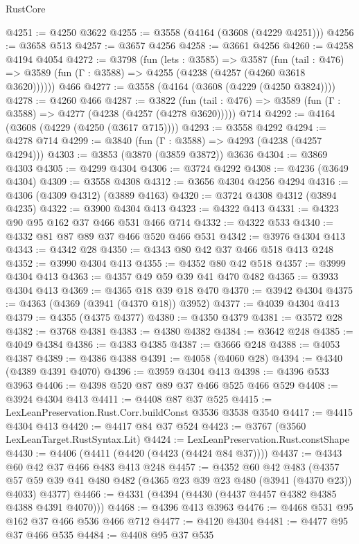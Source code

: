 \begin{lexlean}{RustCore}
\begin{coremodule}
@4251 := @4250 @3622
@4255 := @3558 (@4164 (@3608 (@4229 @4251)))
@4256 := @3658 @513
@4257 := @3657 @4256
@4258 := @3661 @4256
@4260 := @4258 @4194 @4054
@4272 := @3798
    (fun (lets : @3585) =>
    @3587
      (fun (tail : @476) => @3589 (fun (Γ : @3588) => @4255 (@4238 (@4257 (@4260 @3618 @3620))))))
    @466
@4277 := @3558 (@4164 (@3608 (@4229 (@4250 @3824))))
@4278 := @4260 @466
@4287 := @3822
    (fun (tail : @476) => @3589 (fun (Γ : @3588) => @4277 (@4238 (@4257 (@4278 @3620)))))
    @714
@4292 := @4164 (@3608 (@4229 (@4250 (@3617 @715))))
@4293 := @3558 @4292
@4294 := @4278 @714
@4299 := @3840 (fun (Γ : @3588) => @4293 (@4238 (@4257 @4294)))
@4303 := @3853 (@3870 (@3859 @3872)) @3636
@4304 := @3869 @4303
@4305 := @4299 @4304
@4306 := @3724 @4292
@4308 := @4236 (@3649 @4304)
@4309 := @3558 @4308
@4312 := @3656 @4304 @4256 @4294
@4316 := @4306 (@4309 @4312) (@3889 @4163)
@4320 := @3724 @4308 @4312 (@3894 @4235)
@4322 := @3900 @4304 @413
@4323 := @4322 @413
@4331 := @4323 @90 @95 @162 @37 @466 @531 @466 @714
@4332 := @4322 @533
@4340 := @4332 @81 @87 @89 @37 @466 @520 @466 @531
@4342 := @3976 @4304 @413
@4343 := @4342 @28
@4350 := @4343 @80 @42 @37 @466 @518 @413 @248
@4352 := @3990 @4304 @413
@4355 := @4352 @80 @42 @518
@4357 := @3999 @4304 @413
@4363 := @4357 @49 @59 @39 @41 @470 @482
@4365 := @3933 @4304 @413
@4369 := @4365 @18 @39 @18 @470
@4370 := @3942 @4304
@4375 := @4363 (@4369 (@3941 (@4370 @18)) @3952)
@4377 := @4039 @4304 @413
@4379 := @4355 (@4375 @4377)
@4380 := @4350 @4379
@4381 := @3572 @28
@4382 := @3768 @4381
@4383 := @4380 @4382
@4384 := @3642 @248
@4385 := @4049 @4384
@4386 := @4383 @4385
@4387 := @3666 @248
@4388 := @4053 @4387
@4389 := @4386 @4388
@4391 := @4058 (@4060 @28)
@4394 := @4340 (@4389 @4391 @4070)
@4396 := @3959 @4304 @413
@4398 := @4396 @533 @3963
@4406 := @4398 @520 @87 @89 @37 @466 @525 @466 @529
@4408 := @3924 @4304 @413
@4411 := @4408 @87 @37 @525
@4415 := LexLeanPreservation.Rust.Corr.buildConst @3536 @3538 @3540
@4417 := @4415 @4304 @413
@4420 := @4417 @84 @37 @524
@4423 := @3767 (@3560 LexLeanTarget.RustSyntax.Lit)
@4424 := LexLeanPreservation.Rust.constShape
@4430 := @4406 (@4411 (@4420 (@4423 (@4424 @84 @37))))
@4437 := @4343 @60 @42 @37 @466 @483 @413 @248
@4457 := @4352
    @60
    @42
    @483
    (@4357 @57 @59 @39 @41 @480 @482 (@4365 @23 @39 @23 @480 (@3941 (@4370 @23)) @4033) @4377)
@4466 := @4331 (@4394 (@4430 (@4437 @4457 @4382 @4385 @4388 @4391 @4070)))
@4468 := @4396 @413 @3963
@4476 := @4468 @531 @95 @162 @37 @466 @536 @466 @712
@4477 := @4120 @4304
@4481 := @4477 @95 @37 @466 @535
@4484 := @4408 @95 @37 @535

\end{coremodule}
\end{lexlean}
